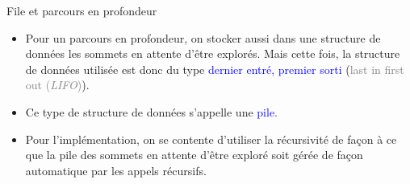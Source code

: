 \documentclass[10pt]{beamer}
\begin{document}
\begin{frame}[fragile]{\Ctitle}{\stitle}
	\begin{block}{File et parcours en profondeur}
		\begin{itemize}
			\item<1-> Pour un parcours en profondeur, on stocker aussi dans une structure de données les sommets en attente d'être explorés. Mais cette fois, la structure de données utilisée est donc du type \textcolor{blue}{dernier entré, premier sorti} (\textcolor{gray}{last in first out (\textit{LIFO})}).
			\item<2-> Ce type de structure de données s'appelle une \textcolor{blue}{pile}.
			\item<3-> Pour l'implémentation, on se contente d'utiliser la récursivité de façon à ce que la pile des sommets en attente d'être exploré soit gérée de façon automatique par les appels récursifs.
		\end{itemize}
	\end{block}
\end{frame}
\end{document}
